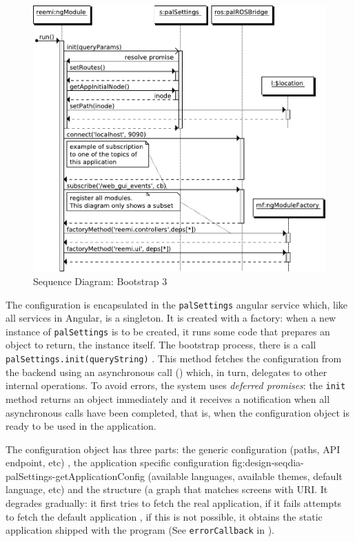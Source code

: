 \begin{figure}[htb]
    \centering
    \includegraphics{figures/design/seqdia/bootstrap-3.pdf}
    \caption{Sequence Diagram: Bootstrap 3}
    \label{fig:design-seqdia-bootstrap-3}
\end{figure}

The configuration is encapsulated in the \texttt{palSettings} angular service which, like all services in Angular, is a singleton.
It is created with a factory: when a new instance of \texttt{palSettings} is to be created, it runs some code that prepares an object to return, the instance itself.
The bootstrap process, there is a call \lstinline$palSettings.init(queryString)$ .
This method fetches the configuration from the backend using an asynchronous call () which, in turn, delegates to other internal operations.
To avoid errors, the system uses \emph{deferred promises}: the \texttt{init} method returns an object immediately and it receives a notification when all asynchronous calls have been completed, that is, when the configuration object is ready to be used in the application.

The configuration object has three parts: the generic configuration (paths, \ac{API} endpoint, etc) , the application specific configuration {fig:design-seqdia-palSettings-getApplicationConfig} (available languages, available themes, default language, etc) and the structure  (a graph that matches screens with \ac{URI}.
It degrades gradually: it first tries to fetch the real application, if it fails attempts to fetch the default application , if this is not possible, it obtains the static application shipped with the program (See \texttt{errorCallback} in ).

